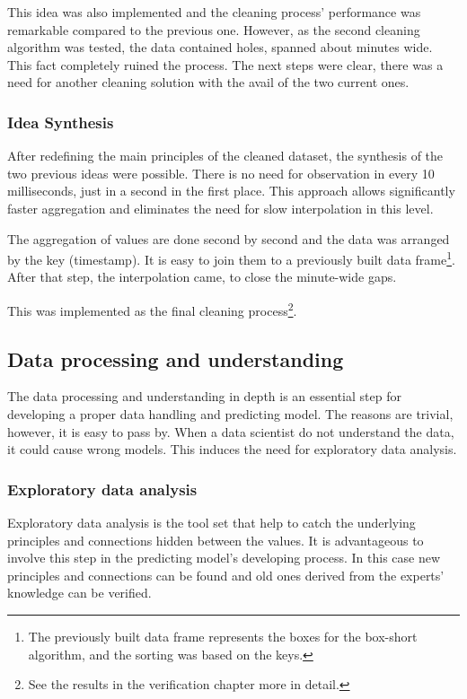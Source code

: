 		This idea was also implemented and the cleaning process' performance was remarkable compared to the previous one. However, as the second cleaning algorithm was tested, the data contained holes, spanned about minutes wide. This fact completely ruined the process. The next steps were clear, there was a need for another cleaning solution with the avail of the two current ones.
\clearpage\subsubsection{Idea Synthesis}
		After redefining the main principles of the cleaned dataset, the synthesis of the two previous ideas were possible.
		There is no need for observation in every 10 milliseconds, just in a second in the first place. This approach allows significantly faster aggregation and eliminates the need for slow interpolation in this level.

		The aggregation of values are done second by second and the data was arranged by the key (timestamp). It is easy to join them to a previously built data frame\footnote{The previously built data frame represents the boxes for the box-short algorithm, and the sorting was based on the keys.}. After that step, the interpolation came, to close the minute-wide gaps.

		This was implemented as the final cleaning process\footnote{See the results in the verification chapter more in detail.}.
\subsection{Data processing and understanding}
		The data processing and understanding in depth is an essential step for developing a proper data handling and predicting model.
		The reasons are trivial, however, it is easy to pass by. When a data scientist do not understand the data, it could cause wrong models. This induces the need for exploratory data analysis.
	\subsubsection{Exploratory data analysis}
		Exploratory data analysis is the tool set that help to catch the underlying principles and connections hidden between the values. It is advantageous to involve this step in the predicting model's developing process. In this case new principles and connections can be found and old ones derived from the experts' knowledge can be verified.
